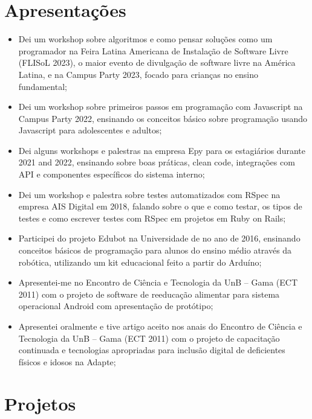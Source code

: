 \section{Apresentações}

\begin{itemize}
    \item Dei um workshop sobre algoritmos e como pensar soluções como um programador na Feira Latina Americana de Instalação de Software Livre (FLISoL 2023), o maior evento de divulgação de software livre na América Latina, e na Campus Party 2023, focado para crianças no ensino fundamental;
    \item Dei um workshop sobre primeiros passos em programação com Javascript na Campus Party 2022, ensinando os conceitos básico sobre programação usando Javascript para adolescentes e adultos;
    \item Dei alguns workshops e palestras na empresa Epy para os estagiários durante 2021 and 2022, ensinando sobre boas práticas, clean code, integrações com API e componentes específicos do sistema interno;
    \item Dei um workshop e palestra sobre testes automatizados com RSpec na empresa AIS Digital em 2018, falando sobre o que e como testar, os tipos de testes e como escrever testes com RSpec em projetos em Ruby on Rails;
    \item Participei do projeto Edubot na Universidade de no ano de 2016, ensinando conceitos básicos de programação para alunos do ensino médio através da robótica, utilizando um kit educacional feito a partir do Arduíno;
    \item Apresentei-me no Encontro de Ciência e Tecnologia da UnB – Gama (ECT 2011) com o projeto de software de reeducação alimentar para sistema operacional Android com apresentação de protótipo;
    \item Apresentei oralmente e tive artigo aceito nos anais do Encontro de Ciência e Tecnologia da UnB – Gama (ECT 2011) com o projeto de capacitação continuada e tecnologias apropriadas para inclusão digital de deficientes físicos e idosos na Adapte;
\end{itemize}


\section{Projetos}

